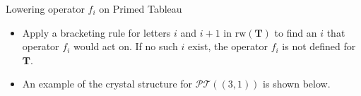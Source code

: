 \documentclass[final]{beamer}
\theoremstyle{definition}
\numberwithin{equation}{section}
\newlength{\onecolwid}
\begin{document}
\begin{frame}[t]
\begin{columns}[t]
\begin{column}{\onecolwid}
\begin{block}{Lowering operator $f_i$ on Primed Tableau}
\begin{itemize}
	\begin{enumerate}
	\item List all primed letters in the tableau, column by column, in decreasing order within each column, moving from the rightmost column to the left, and with all the primes removed.
	\item Then list all unprimed elements, row by row, in increasing order within each row, moving from the bottommost row to the top.
	\end{enumerate}

\item Apply a bracketing rule for letters $i$ and $i+1$ in $\mathrm{rw}(\mathbf{T})$ to find an $i$ that operator $f_i$ would act on. If no such $i$ exist, the operator $f_i$ is not defined for $\mathbf{T}$.

\item An example of the crystal structure for $\mathcal{PT} ((3,1))$ is shown below.


\end{itemize}
\end{block}
\end{column}
\end{columns}
\end{frame}
\end{document}
